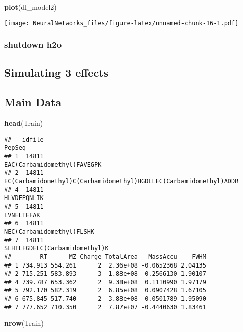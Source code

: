\documentclass[]{article}
\newenvironment{Shaded}{\begin{snugshade}}{\end{snugshade}}
\newcommand{\KeywordTok}[1]{\textcolor[rgb]{0.13,0.29,0.53}{\textbf{#1}}}
\newcommand{\NormalTok}[1]{#1}
\begin{document}
\begin{Shaded}
\begin{Highlighting}[]
\KeywordTok{plot}\NormalTok{(dl_model2)}
\end{Highlighting}
\end{Shaded}

\texttt{[image: NeuralNetworks\_files/figure-latex/unnamed-chunk-16-1.pdf]}

\subsubsection{shutdown h2o}\label{shutdown-h2o}

\subsection{Simulating 3 effects}\label{simulating-3-effects}

\subsection{Main Data}\label{main-data}

\begin{Shaded}
\begin{Highlighting}[]
\KeywordTok{head}\NormalTok{(Train)}
\end{Highlighting}
\end{Shaded}

\begin{verbatim}
##   idfile                                                            PepSeq
## 1  14811                                       EAC(Carbamidomethyl)FAVEGPK
## 2  14811 EC(Carbamidomethyl)C(Carbamidomethyl)HGDLLEC(Carbamidomethyl)ADDR
## 4  14811                                                       HLVDEPQNLIK
## 5  14811                                                        LVNELTEFAK
## 6  14811                                         NEC(Carbamidomethyl)FLSHK
## 7  14811                                     SLHTLFGDELC(Carbamidomethyl)K
##        RT      MZ Charge TotalArea   MassAccu    FWHM
## 1 734.913 554.261      2  2.36e+08 -0.0652368 2.04135
## 2 715.251 583.893      3  1.88e+08  0.2566130 1.90107
## 4 739.787 653.362      2  9.38e+08  0.1110990 1.97179
## 5 792.170 582.319      2  6.85e+08  0.0907428 1.67105
## 6 675.845 517.740      2  3.88e+08  0.0501789 1.95090
## 7 777.652 710.350      2  7.87e+07 -0.4440630 1.83461
\end{verbatim}

\begin{Shaded}
\begin{Highlighting}[]
\KeywordTok{nrow}\NormalTok{(Train)}
\end{Highlighting}
\end{Shaded}
\end{document}
